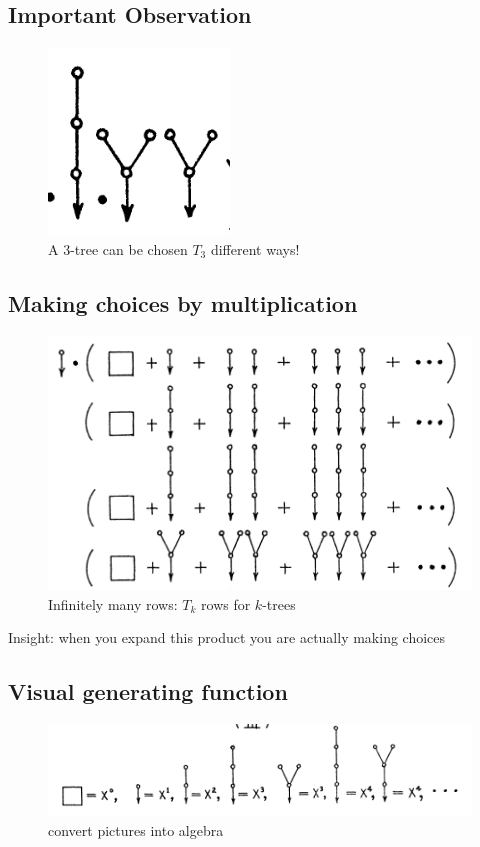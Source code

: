 \documentclass{article}
\theoremstyle{definition}
\theoremstyle{question}
\begin{document}
\subsection{Important Observation}
        \begin{figure}[h]
            \centering
            \includegraphics{images/tree2.png}
            \caption{A $3$-tree can be chosen $T_3$ different ways!}
            \label{fig:enter-label}
        \end{figure}

    \subsection{Making choices by multiplication}
        \begin{figure}[h]
            \centering
            \includegraphics[scale=0.5]{images/tree3.png}
            \caption{Infinitely many rows: $T_k$ rows for $k$-trees}
            \label{fig:enter-label}
        \end{figure}
        Insight: when you expand this product you are actually making choices

\newpage

    \subsection{Visual generating function}
        \begin{figure}[h]
            \centering
            \includegraphics[scale=0.6]{images/tree5.png}
            \caption{convert pictures into algebra}
            \label{fig:enter-label}
        \end{figure}
\end{document}

